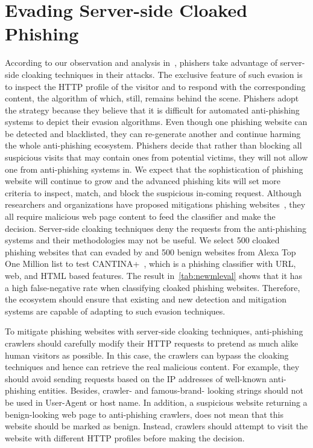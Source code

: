 \section{Evading Server-side Cloaked Phishing}

According to our observation and analysis in~, phishers take advantage of server-side cloaking techniques in their attacks.
The exclusive feature of such evasion is to inspect the HTTP profile of the visitor and to respond with the corresponding content,
the algorithm of which, still, remains behind the scene.
Phishers adopt the strategy because they believe that it is difficult for automated anti-phishing systems to depict their evasion algorithms.
Even though one phishing website can be detected and blacklisted, they can re-generate another and continue harming the whole anti-phishing ecosystem.
Phishers decide that rather than blocking all suspicious visits that may contain ones from potential victims, they will not allow one from anti-phishing systems in.
We expect that the sophistication of phishing website will continue to grow and the advanced phishing kits will set more criteria to inspect, match, and block the suspicious in-coming request.
Although researchers and organizations have proposed mitigations phishing websites~\cite{xiang2011cantina+, lin2021phishpedia}, they all require malicious web page content to feed the classifier and make the decision.
Server-side cloaking techniques deny the requests from the anti-phishing systems and their methodologies may not be useful.
We select 500 cloaked phishing websites that can evaded by \spartacus and 500 benign websites from Alexa Top One Million list to test CANTINA+~\cite{xiang2011cantina+}, which is a phishing classifier with URL, web, and HTML based features.
The result in~\autoref{tab:newmleval} shows that it has a high false-negative rate when classifying cloaked phishing websites.
Therefore, the ecosystem should ensure
that existing and new detection and mitigation systems are capable of adapting to such evasion techniques.

\newmleval

To mitigate phishing websites with server-side cloaking techniques, anti-phishing crawlers should carefully modify their HTTP requests to pretend as much alike human visitors as possible.
In this case, the crawlers can bypass the cloaking techniques and hence can retrieve the real malicious content.
For example, they should avoid sending requests based on the IP addresses of well-known anti-phishing entities.
Besides, crawler- and famous-brand- looking strings should not be used in User-Agent or host name.
In addition, a suspicious website returning a benign-looking web page to anti-phishing crawlers, does not mean that this website should be marked as benign.
Instead, crawlers should attempt to visit the website with different HTTP profiles before making the decision.

